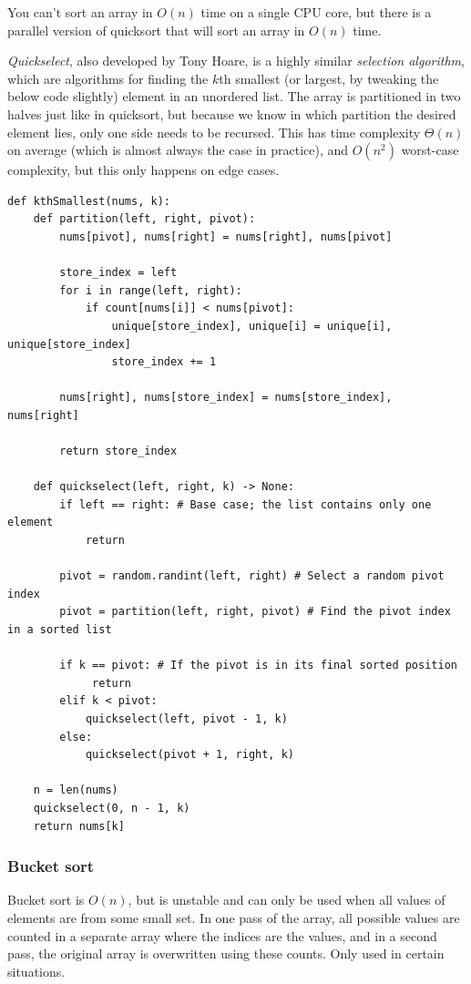 \documentclass[table, xcdraw]{article}%
\begin{document}
You can’t sort an array in $O(n)$ time on a single CPU core, but there is a parallel version of quicksort that will sort an array in $O(n)$ time.

\emph{Quickselect}, also developed by Tony Hoare, is a highly similar \emph{selection algorithm}, which are algorithms for finding the $k$th smallest (or largest, by tweaking the below code slightly) element in an unordered list. The array is partitioned in two halves just like in quicksort, but because we know in which partition the desired element lies, only one side needs to be recursed. This has time complexity $\Theta(n)$ on average (which is almost always the case in practice), and $O(n^2)$ worst-case complexity, but this only happens on edge cases.

\begin{verbatim}
def kthSmallest(nums, k):
    def partition(left, right, pivot):
        nums[pivot], nums[right] = nums[right], nums[pivot]
        
        store_index = left
        for i in range(left, right):
            if count[nums[i]] < nums[pivot]:
                unique[store_index], unique[i] = unique[i], unique[store_index]
                store_index += 1

        nums[right], nums[store_index] = nums[store_index], nums[right]
        
        return store_index
    
    def quickselect(left, right, k) -> None:
        if left == right: # Base case; the list contains only one element
            return
        
        pivot = random.randint(left, right) # Select a random pivot index
        pivot = partition(left, right, pivot) # Find the pivot index in a sorted list
        
        if k == pivot: # If the pivot is in its final sorted position
             return
        elif k < pivot:
            quickselect(left, pivot - 1, k)
        else:
            quickselect(pivot + 1, right, k)

    n = len(nums)
    quickselect(0, n - 1, k)
    return nums[k]
\end{verbatim}

\subsubsection{Bucket sort}

Bucket sort is $O(n)$, but is unstable and can only be used when all values of elements are from some small set. In one pass of the array, all possible values are counted in a separate array where the indices are the values, and in a second pass, the original array is overwritten using these counts. Only used in certain situations.
\end{document}
